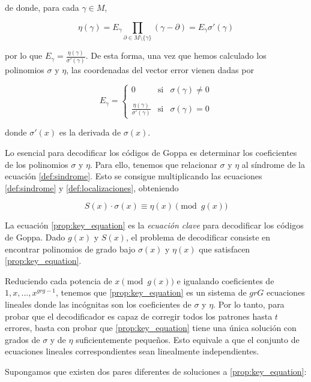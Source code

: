 de donde, para cada $\gamma \in M$,

$$\eta (\gamma) = E_\gamma \prod_{\partial \in M \setminus \{ \gamma \} } (\gamma - \partial) = E_\gamma \sigma'(\gamma)$$

por lo que $E_\gamma = \frac{\eta(\gamma)}{\sigma'(\gamma)}$. De esta forma, una vez que hemos calculado los polinomios $\sigma$ y $\eta$, las coordenadas del vector error vienen dadas por 

\[
    E_\gamma = \left\{ \begin{array}{lcc}
    0 &   \text{si}  & \sigma(\gamma) \neq 0 \\
    \\ \frac{\eta(\gamma)}{\sigma'(\gamma)} &  \text{si} & \sigma(\gamma) = 0
    \end{array}
    \right.
\]

donde $\sigma'(x)$ es la derivada de $\sigma(x)$.

Lo esencial para decodificar los códigos de Goppa es determinar los coeficientes de los polinomios $\sigma$ y $\eta$. Para ello, tenemos que relacionar $\sigma$ y $\eta$ al síndrome de la ecuación \ref{def:sindrome}. Esto se consigue multiplicando las ecuaciones \ref{def:sindrome} y \ref{def:localizaciones}, obteniendo

\begin{equation}
    \label{prop:key_equation}
    S(x) \cdot \sigma(x) \equiv \eta(x) \pmod{g(x)}
\end{equation}

La ecuación \ref{prop:key_equation} es la \emph{ecuación clave} para decodificar los códigos de Goppa. Dado $g(x)$ y $S(x)$, el problema de decodificar consiste en encontrar polinomios de grado bajo $\sigma(x)$ y $\eta(x)$ que satisfacen \ref{prop:key_equation}.

Reduciendo cada potencia de $x \pmod{g(x)}$ e igualando coeficientes de $1, x, ..., x^{gr g - 1}$, tenemos que \ref{prop:key_equation} es un sistema de $gr G$ ecuaciones lineales donde las incógnitas son los coeficientes de $\sigma$ y $\eta$. Por lo tanto, para probar que el decodificador es capaz de corregir todos los patrones hasta $t$ errores, basta con probar que \ref{prop:key_equation} tiene una única solución con grados de $\sigma$ y de $\eta$ suficientemente pequeños. Esto equivale a que el conjunto de ecuaciones lineales correspondientes sean linealmente independientes.

Supongamos que existen dos pares diferentes de soluciones a \ref{prop:key_equation}:

